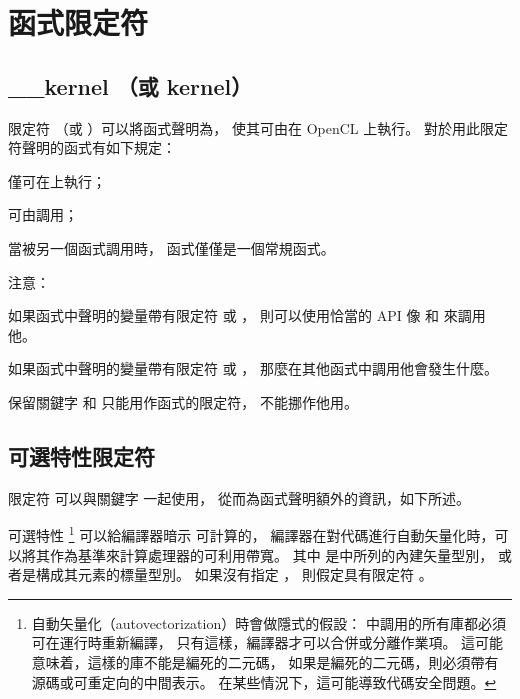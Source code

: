 \section{函式限定符}

\subsection{__kernel （或 kernel）}

限定符  （或 ）可以將函式聲明為，
使其可由在 OpenCL 上執行。
對於用此限定符聲明的函式有如下規定：
\startigBase
\item 僅可在上執行；
\item 可由調用；
\item 當被另一個函式調用時，  函式僅僅是一個常規函式。
\stopigBase

注意：

如果函式中聲明的變量帶有限定符  或 ，
則可以使用恰當的 API
 像  和  來調用他。

如果函式中聲明的變量帶有限定符  或 ，
那麼在其他函式中調用他會發生什麼。

保留關鍵字  和  只能用作函式的限定符，
不能挪作他用。

\subsection{可選特性限定符}

限定符  可以與關鍵字  一起使用，
從而為函式聲明額外的資訊，如下所述。

可選特性 \footnote{
自動矢量化（autovectorization）時會做隱式的假設：
  中調用的所有庫都必須可在運行時重新編譯，
只有這樣，編譯器才可以合併或分離作業項。
這可能意味着，這樣的庫不能是編死的二元碼，
如果是編死的二元碼，則必須帶有源碼或可重定向的中間表示。
在某些情況下，這可能導致代碼安全問題。}
 可以給編譯器暗示  可計算的{}，
編譯器在對代碼進行自動矢量化時，可以將其作為基準來計算處理器的可利用帶寬。
其中  是中所列的內建矢量型別，
或者是構成其元素的標量型別。
如果沒有指定 ，
則假定具有限定符 。


